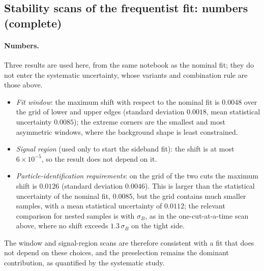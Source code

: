 \subsection{Stability scans of the frequentist fit: numbers (complete)}
\paragraph*{Numbers.} Three results are used here, from the same notebook as the nominal fit; they do not enter the systematic uncertainty, whose variants and combination rule are those above.
\begin{itemize}[leftmargin=*,itemsep=1pt]
\item \emph{Fit window}: the maximum shift with respect to the nominal fit is $0.0048$ over the grid of lower and upper edges (standard deviation $0.0018$, mean statistical uncertainty $0.0085$); the extreme corners are the smallest and most asymmetric windows, where the background shape is least constrained.
\item \emph{Signal region} (used only to start the sideband fit): the shift is at most $6\times10^{-5}$, so the result does not depend on it.
\item \emph{Particle-identification requirements}: on the grid of the two cuts the maximum shift is $0.0126$ (standard deviation $0.0046$). This is larger than the statistical uncertainty of the nominal fit, $0.0085$, but the grid contains much smaller samples, with a mean statistical uncertainty of $0.0112$; the relevant comparison for nested samples is with $\sigma_B$, as in the one-cut-at-a-time scan above, where no shift exceeds $1.3\,\sigma_B$ on the tight side.
\end{itemize}
The window and signal-region scans are therefore consistent with a fit that does not depend on these choices, and the preselection remains the dominant contribution, as quantified by the systematic study.

